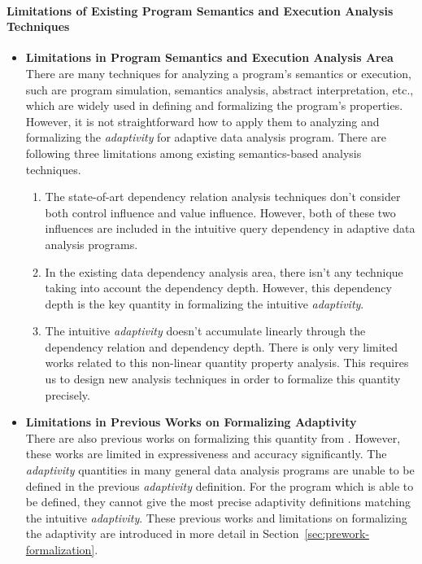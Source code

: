 \paragraph{Limitations of Existing Program Semantics and Execution Analysis Techniques}

\begin{itemize}
 \item \textbf{Limitations in Program Semantics and Execution Analysis Area}
 \\
There are many techniques for analyzing a program's semantics or execution, such are program simulation, 
semantics analysis, abstract interpretation, etc., which are widely used in defining
and formalizing the program's properties.
However, it is not straightforward how to apply them to analyzing and formalizing the \emph{adaptivity}
for adaptive data analysis program.
There are following three limitations among existing semantics-based analysis techniques.
\begin{enumerate}
\item The state-of-art dependency relation analysis techniques don't
consider both control influence and value influence. However, both of these
two influences are included in the intuitive query dependency 
in adaptive data analysis programs.
\item In the existing data dependency analysis area, there isn't any technique taking into account
the dependency depth. However, this dependency depth is the key quantity in formalizing the intuitive \emph{adaptivity}.
\item The intuitive \emph{adaptivity} doesn't accumulate linearly through the dependency relation and 
dependency depth. There is only very limited works related to this non-linear quantity property analysis.
This requires us to design new analysis techniques in order to formalize this quantity precisely.
\end{enumerate}
\item \textbf{Limitations in Previous Works on Formalizing Adaptivity} 
\\
There are also previous works on formalizing this quantity from \cite{weihao22}. However, these works
are limited in expressiveness and accuracy significantly.
The \emph{adaptivity} quantities in many general data analysis programs are unable to be defined in the previous \emph{adaptivity} definition.
For the program which is able to be defined,
they cannot give the most precise adaptivity definitions matching the intuitive \emph{adaptivity}.
These previous works and limitations on formalizing the adaptivity are introduced in more detail in Section~\ref{sec:prework-formalization}.
\end{itemize}
%

